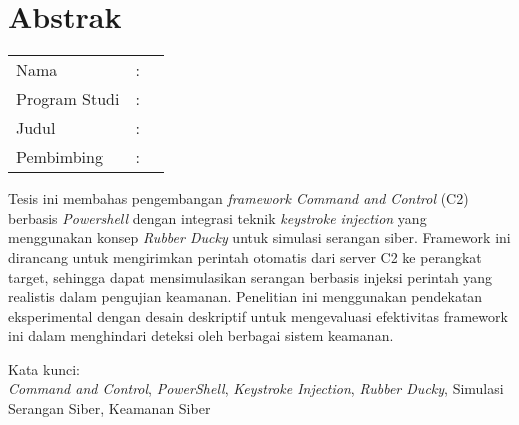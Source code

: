 %
%
%

\chapter*{Abstrak}

\vspace*{0.2cm}
{
	\setlength{\parindent}{0pt}
	
	\begin{tabular}{@{}l l p{10cm}}
		Nama&: & \penulis \\
		Program Studi&: & \program \\
		Judul&: & \judul \\
		Pembimbing&: & \pembimbing \\
	\end{tabular}

	\bigskip
	\bigskip

	Tesis ini membahas pengembangan \textit{framework Command and Control} (C2) berbasis \textit{Powershell} dengan integrasi teknik \textit{keystroke injection} yang menggunakan konsep \textit{Rubber Ducky} untuk simulasi serangan siber. Framework ini dirancang untuk mengirimkan perintah otomatis dari server C2 ke perangkat target, sehingga dapat mensimulasikan serangan berbasis injeksi perintah yang realistis dalam pengujian keamanan. Penelitian ini menggunakan pendekatan eksperimental dengan desain deskriptif untuk mengevaluasi efektivitas framework ini dalam menghindari deteksi oleh berbagai sistem keamanan.

	\bigskip

	Kata kunci:\\
	\textit{Command and Control}, \textit{PowerShell}, \textit{Keystroke Injection}, \textit{Rubber Ducky}, Simulasi Serangan Siber, Keamanan Siber
}

\newpage
